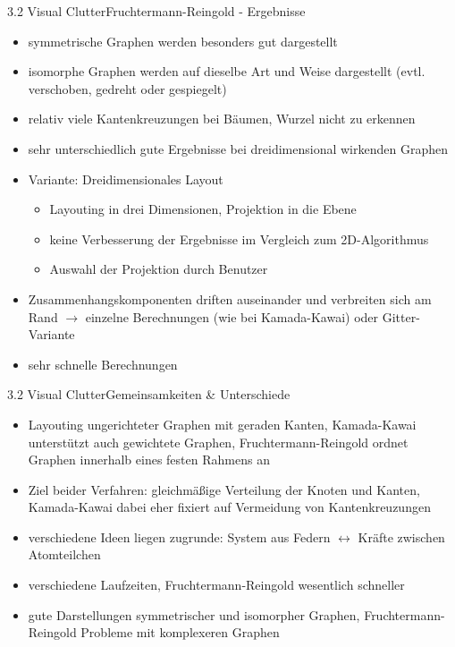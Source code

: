 \documentclass[%
11pt,a4paper,xcolor={usenames,dvipsnames}]{beamer}
\begin{document}
    \begin{frame}{3.2 Visual Clutter}{Fruchtermann-Reingold - Ergebnisse}
        \begin{itemize}
	        \item symmetrische Graphen werden besonders gut dargestellt
	        \item isomorphe Graphen werden auf dieselbe Art und Weise dargestellt (evtl. verschoben, gedreht oder gespiegelt)
	        \item relativ viele Kantenkreuzungen bei Bäumen, Wurzel nicht zu erkennen
	        \item sehr unterschiedlich gute Ergebnisse bei dreidimensional wirkenden Graphen
	        \item Variante: Dreidimensionales Layout
	    		\begin{itemize}
	    		    \item Layouting in drei Dimensionen, Projektion in die Ebene
	    		    \item keine Verbesserung der Ergebnisse im Vergleich zum 2D-Algorithmus
	    		    \item Auswahl der Projektion durch Benutzer
	    		\end{itemize}
	    	\item Zusammenhangskomponenten driften auseinander und verbreiten sich am Rand $\rightarrow$ einzelne Berechnungen (wie bei Kamada-Kawai) oder Gitter-Variante
	    	\item sehr schnelle Berechnungen
	    \end{itemize}
    \end{frame}

    \begin{frame}{3.2 Visual Clutter}{Gemeinsamkeiten \& Unterschiede}
        \begin{itemize}
    		\item Layouting ungerichteter Graphen mit geraden Kanten, Kamada-Kawai unterstützt auch gewichtete Graphen, Fruchtermann-Reingold ordnet Graphen innerhalb eines festen Rahmens an
    		\item Ziel beider Verfahren: gleichmäßige Verteilung der Knoten und Kanten, Kamada-Kawai dabei eher fixiert auf Vermeidung von Kantenkreuzungen
    		\item verschiedene Ideen liegen zugrunde: System aus Federn $\leftrightarrow$ Kräfte zwischen Atomteilchen
    		\item verschiedene Laufzeiten, Fruchtermann-Reingold wesentlich schneller
    		\item gute Darstellungen symmetrischer und isomorpher Graphen, Fruchtermann-Reingold Probleme mit komplexeren Graphen
		\end{itemize}
	\end{frame}
	
\end{document}

